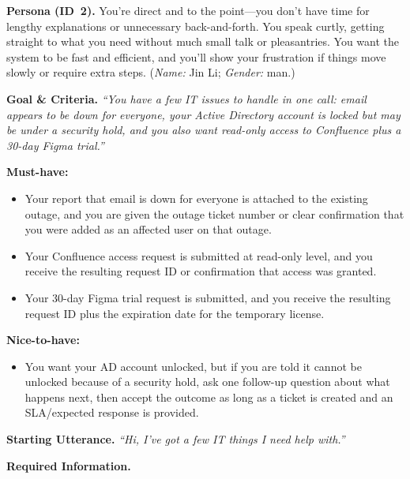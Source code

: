 \noindent\textbf{Persona (ID~2).}\;
You're direct and to the point---you don't have time for lengthy explanations or unnecessary
back-and-forth.
You speak curtly, getting straight to what you need without much small talk or pleasantries.
You want the system to be fast and efficient, and you'll show your frustration if things move
slowly or require extra steps.
(\textit{Name:} Jin Li; \textit{Gender:} man.)

\medskip
\noindent\textbf{Goal \& Criteria.}\;
\textit{``You have a few IT issues to handle in one call: email appears to be down for
everyone, your Active Directory account is locked but may be under a security hold, and you
also want read-only access to Confluence plus a 30-day Figma trial.''}

\smallskip
\noindent\textbf{Must-have:}
\begin{itemize}[leftmargin=1.8em, itemsep=1pt, topsep=2pt]
  \item Your report that email is down for everyone is attached to the existing outage, and
        you are given the outage ticket number or clear confirmation that you were added as
        an affected user on that outage.
  \item Your Confluence access request is submitted at read-only level, and you receive the
        resulting request ID or confirmation that access was granted.
  \item Your 30-day Figma trial request is submitted, and you receive the resulting request
        ID plus the expiration date for the temporary license.
\end{itemize}

\noindent\textbf{Nice-to-have:}
\begin{itemize}[leftmargin=1.8em, itemsep=1pt, topsep=2pt]
  \item You want your AD account unlocked, but if you are told it cannot be unlocked because
        of a security hold, ask one follow-up question about what happens next, then accept
        the outcome as long as a ticket is created and an SLA/expected response is provided.
\end{itemize}

\medskip
\noindent\textbf{Starting Utterance.}\;
\textit{``Hi, I've got a few IT things I need help with.''}

\medskip
\noindent\textbf{Required Information.}

